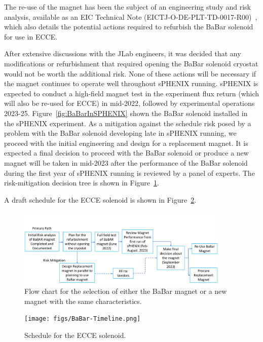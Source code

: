 % 
%

The re-use of the magnet has been the subject of an engineering study and risk analysis, available as an EIC Technical Note (EICTJ-O-DE-PLT-TD-0017-R00)~\cite{BaBarAnalysis}, which also details the potential actions required to refurbish the BaBar solenoid for use in ECCE. 

After extensive discussions with the JLab engineers, it was decided that any modifications or refurbishment that required opening the BaBar solenoid cryostat would not be worth the additional risk. None of these actions will be necessary if the magnet continues to operate well throughout sPHENIX running. sPHENIX is expected to conduct a high-field magnet test in the experiment flux return (which will also be re-used for ECCE) in mid-2022, followed by experimental operations 2023-25. Figure~\ref{fig:BaBarInSPHENIX} shown the BaBar solenoid installed in the sPHENIX experiment. As a mitigation against the schedule risk posed by a problem with the BaBar solenoid developing late in sPHENIX running, we proceed with the initial engineering and design for a replacement magnet. It is expected a final decision to proceed with the BaBar solenoid or produce a new magnet will be taken in mid-2023 after the performance of the BaBar solenoid during the first year of sPHENIX running is reviewed by a panel of experts.  The risk-mitigation decision tree is shown in Figure~\ref{fig:risk_tree}. 

A draft schedule for the ECCE solenoid is shown in Figure~\ref{fig:magnet_schedule}. 

\begin{figure}[h!tbp]
    \centering
    \includegraphics[width=0.9\textwidth]{figs/flow.png}
    \caption{
   Flow chart for the selection of either the BaBar magnet or a new magnet with the same characteristics.}
    \label{fig:risk_tree}
\end{figure}

\begin{figure}[h!tbp]
    \centering
    \texttt{[image: figs/BaBar-Timeline.png]}
    \caption{Schedule for the ECCE solenoid.}
    \label{fig:magnet_schedule}
\end{figure}